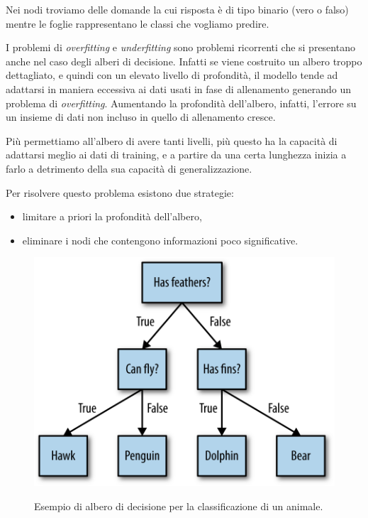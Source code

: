 \documentclass[a4paper,12pt]{report}
\begin{document}


Nei nodi troviamo delle domande la cui risposta è di tipo binario (vero o falso) mentre le foglie rappresentano le classi che vogliamo predire.

I problemi di \textit{overfitting} e \textit{underfitting} sono problemi ricorrenti che si presentano anche nel caso degli alberi di decisione. Infatti se viene costruito un albero troppo dettagliato, e quindi con un elevato livello di profondità, il modello tende ad adattarsi in maniera eccessiva ai dati usati in fase di allenamento generando un problema di \textit{overfitting}.
Aumentando la profondità dell'albero, infatti, l'errore su un insieme di dati non incluso in quello di allenamento cresce.

Più permettiamo all’albero di avere tanti livelli, più questo ha la capacità di adattarsi meglio ai dati di training, e a partire da una certa lunghezza inizia a farlo a detrimento della sua capacità di generalizzazione. 

Per risolvere questo problema esistono due strategie:
\begin{itemize}
    \item limitare a priori la profondità dell'albero, 
    \item eliminare i nodi che contengono informazioni poco significative.
\end{itemize}

\begin{figure}[ht]
    \centering
    \includegraphics[scale = 0.3]{images/decisione_tree.png}
    \label{fig:decision_tree}
    \caption{Esempio di albero di decisione per la classificazione di un animale. \cite{figure_copyright}}
\end{figure}
\end{document}
